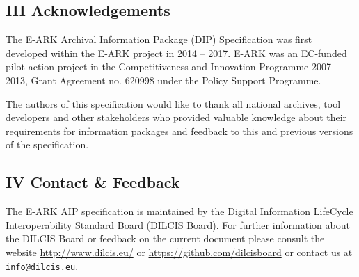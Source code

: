 \hypertarget{iii-acknowledgements}{%
\subsection*{III Acknowledgements}\label{iii-acknowledgements}}

The E-ARK Archival Information Package (DIP) Specification was first
developed within the E-ARK project in 2014 -- 2017. E-ARK was an
EC-funded pilot action project in the Competitiveness and Innovation
Programme 2007- 2013, Grant Agreement no. 620998 under the Policy
Support Programme.

The authors of this specification would like to thank all national
archives, tool developers and other stakeholders who provided valuable
knowledge about their requirements for information packages and feedback
to this and previous versions of the specification.

\hypertarget{iv-contact--feedback}{%
\subsection*{IV Contact \& Feedback}\label{iv-contact--feedback}}

The E-ARK AIP specification is maintained by the Digital Information
LifeCycle Interoperability Standard Board (DILCIS Board). For further
information about the DILCIS Board or feedback on the current document
please consult the website
\href{http://www.dilcis.eu/}{http://www.dilcis.eu/} or
\href{https://github.com/dilcisboard}{https://github.com/dilcisboard} or
contact us at \href{mailto:info@dilcis.eu}{\nolinkurl{info@dilcis.eu}}.
